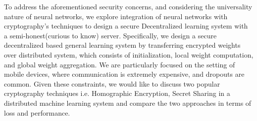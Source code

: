 \documentclass[conference]{IEEEtran}
\begin{document}
To address the aforementioned security concerns, and considering the universality nature of neural networks, we explore integration of neural networks with cryptography's techniques to design a secure Decentralized learning system with a semi-honest(curious to know) server. Specifically, we design a secure decentralized based general learning system by transferring encrypted weights over distributed system, which consists of initialization, local weight computation, and global weight aggregation.
We are particularly focused on the setting of mobile devices, where communication is extremely expensive, and dropouts are common. Given these constraints, we would like to discuss two popular cryptography techniques i.e. Homographic Encryption, Secret Sharing in a distributed machine learning system and compare the two approaches in terms of loss and performance.
\end{document}
